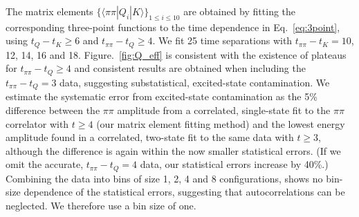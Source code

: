 \documentclass[aps,prl,
superscriptaddress,
showpacs,
preprintnumbers,
bibnotes,
amsmath,
amssymb,
twocolumn,
floatfix,
]{revtex4-1}
\begin{document}
The matrix elements $\{\langle\pi\pi|Q_i|K\rangle\}_{1 \le i \le 10}$ are obtained by fitting the corresponding three-point functions to the time dependence in Eq.~\eqref{eq:3point}, using $t_Q-t_K \ge 6$ and $t_{\pi\pi} - t_Q \ge 4$.  We fit 25 time separations with $t_{\pi\pi} - t_K =10$, 12, 14, 16 and 18.  Figure.~\ref{fig:Q_eff} is consistent with the existence of plateaus for $t_{\pi\pi}-t_Q \ge 4$ and consistent results are obtained when including the $t_{\pi\pi} - t_Q = 3$ data, suggesting substatistical, excited-state contamination.  We estimate the systematic error from excited-state contamination as the 5\% difference between the $\pi\pi$ amplitude from a correlated, single-state fit to the $\pi\pi$ correlator with $t\ge 4$ (our matrix element fitting method) and the lowest energy amplitude found in a correlated, two-state fit to the same data with $t \ge 3$, although the difference is again within the now smaller statistical errors.  (If we omit the accurate, $t_{\pi\pi}-t_Q = 4$ data, our statistical errors increase by 40\%.)   Combining the data into bins of size 1, 2, 4 and 8 configurations, shows no bin-size dependence of the statistical errors, suggesting that autocorrelations can be neglected.  We therefore use a bin size of one.
\end{document}
